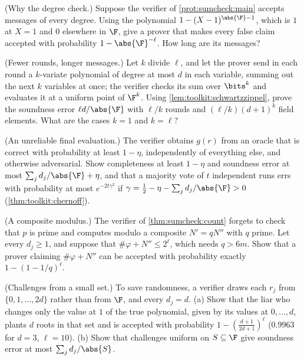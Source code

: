 \begin{refsection}
\begin{exercises}
\item \consolidation (Why the degree check.) Suppose the verifier of \cref{prot:sumcheck:main} accepts messages of every degree. Using the polynomial $1-(X-1)^{\abs{\F}-1}$, which is $1$ at $X=1$ and $0$ elsewhere in $\F$, give a prover that makes every false claim accepted with probability $1-\abs{\F}^{-\ell}$. How long are its messages?\label{ex:sumcheck:degree}

\item \variation (Fewer rounds, longer messages.) Let $k$ divide $\ell$, and let the prover send in each round a $k$-variate polynomial of degree at most $d$ in each variable, summing out the next $k$ variables at once; the verifier checks its sum over $\bits^k$ and evaluates it at a uniform point of $\F^k$. Using \cref{lem:toolkit:schwartzzippel}, prove the soundness error $\ell d/\abs{\F}$ with $\ell/k$ rounds and $(\ell/k)(d+1)^k$ field elements. What are the cases $k=1$ and $k=\ell$?\label{ex:sumcheck:blocks}

\item \variation (An unreliable final evaluation.) The verifier obtains $g(r)$ from an oracle that is correct with probability at least $1-\eta$, independently of everything else, and otherwise adversarial. Show completeness at least $1-\eta$ and soundness error at most $\sum_jd_j/\abs{\F}+\eta$, and that a majority vote of $t$ independent runs errs with probability at most $e^{-2t\gamma^2}$ if $\gamma=\frac12-\eta-\sum_jd_j/\abs{\F}>0$ (\cref{thm:toolkit:chernoff}).\label{ex:sumcheck:noisy}

\item \attack\hard (A composite modulus.) The verifier of \cref{thm:sumcheck:count} forgets to check that $p$ is prime and computes modulo a composite $N'=qN''$ with $q$ prime. Let every $d_j\ge1$, and suppose that $\#\varphi+N''\le2^\ell$, which needs $q>6m$. Show that a prover claiming $\#\varphi+N''$ can be accepted with probability exactly $1-(1-1/q)^\ell$. \label{ex:sumcheck:composite}

\item \attack (Challenges from a small set.) To save randomness, a verifier draws each $r_j$ from $\{0,1,\dots,2d\}$ rather than from $\F$, and every $d_j=d$. (a) Show that the liar who changes only the value at $1$ of the true polynomial, given by its values at $0,\dots,d$, plants $d$ roots in that set and is accepted with probability $1-(\frac{d+1}{2d+1})^\ell$ ($0.9963$ for $d=3$, $\ell=10$). (b) Show that challenges uniform on $S\subseteq\F$ give soundness error at most $\sum_jd_j/\abs{S}$.\label{ex:sumcheck:smallset}


\end{exercises}
\end{refsection}
